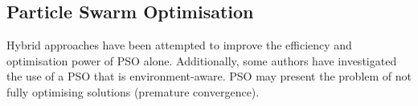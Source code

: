 \documentclass[a4paper,10pt]{article}
\begin{document}
\subsection{Particle Swarm Optimisation}
Hybrid approaches have been attempted to improve the efficiency and optimisation power of PSO alone. Additionally, some 
authors have investigated the use of a PSO that is environment-aware. PSO may present the problem of not fully optimising
solutions (premature convergence).



\end{document}
